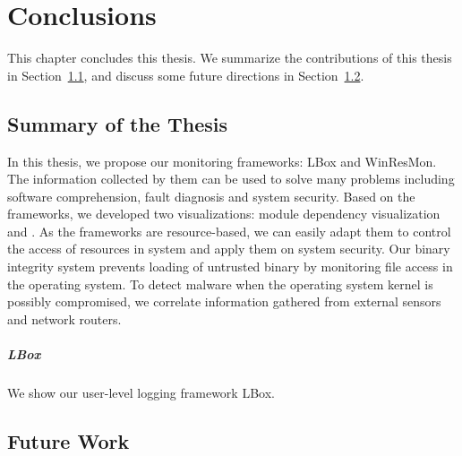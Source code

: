 \chapter{Conclusions}
\label{sec:concl}

This chapter concludes this thesis.
We summarize the contributions of this thesis in Section~\ref{sec:concl-summary},
and discuss some future directions in Section~\ref{sec:future}.

\section{Summary of the Thesis}
\label{sec:concl-summary}

In this thesis, we propose our monitoring frameworks: LBox and WinResMon.
The information collected by them can be used to solve many problems including
software comprehension, fault diagnosis and system security.
Based on the frameworks, we developed two visualizations: module dependency
visualization and .
As the frameworks are resource-based, we can easily adapt them to control
the access of resources in system and apply them on system security.
Our binary integrity system prevents loading of untrusted binary by monitoring
file access in the operating system.
To detect malware when the operating system kernel is possibly compromised,
we correlate information gathered from external sensors and network routers.

\paragraph{LBox}
We show our user-level logging framework LBox.

\section{Future Work}
\label{sec:future}
